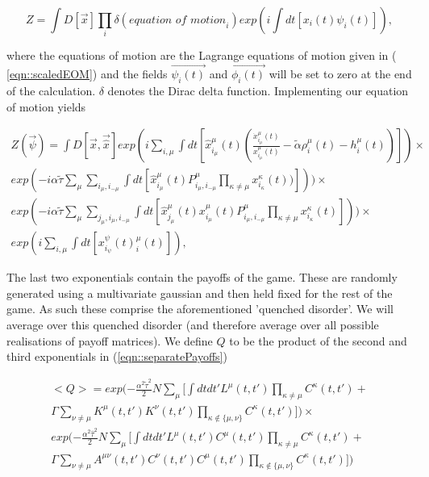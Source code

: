 \documentclass[sigconf]{aamas}
\newcommand{\xmu}[2]{x_{#1_#2}^{#2}(t)}
\newcommand{\payoff}[2]{P^{#2}_{#1_#2, #1_{-#2}}}
\newcommand{\dxmu}[1]{\dot{x}_{#1_\mu}^{\mu} (t)}
\newcommand{\hxmu}[1]{\hat{x}_{#1_\mu}^{\mu} (t)}
\newcommand{\talpha}{\tilde{\alpha}}
\newcommand{\ttau}{\tilde{\tau}}
\newcommand{\htau}{\hat{\tau}}
\begin{document}
\begin{equation}
	Z = \int D[\Vec{x}] \prod_i \delta(\textit{equation of motion}_i) exp(i
	\int dt[x_i(t) \psi_i(t)]), 
\end{equation}

where the equations of motion are the Lagrange equations of motion given in (
\ref{eqn::scaledEOM}) and
the fields $\Vec{\psi_i(t)}$ and $\Vec{\phi_i(t)}$ will be set to zero at the end of the
calculation. $\delta$ denotes the Dirac delta function. Implementing our equation of motion yields

\begin{equation}
\label{eqn::separatePayoffs}
	\begin{split}
	Z(\Vec{\psi}) = \int D[\Vec{x}, \Vec{\hat{x}}] exp( i \sum_{i, \mu} \int dt [ \hxmu{i} (\frac{\dxmu{i}}{\xmu{i}{\mu}} - \talpha \rho_i^\mu (t) - h_i^\mu (t))]) \times \\ exp(-i \alpha \ttau \sum_{\mu} \sum_{i_\mu, i_{-\mu}} \int dt [\hxmu{i} \payoff{i}{\mu} \prod_{\kappa \neq \mu} \xmu{i}{\kappa} )])) 
    \times \\ exp(-i \alpha \ttau \sum_{\mu} \sum_{j_\mu, i_\mu, i_{-\mu}} \int dt [\hxmu{j}  \xmu{i}{\mu} \payoff{i}{\mu} \prod_{\kappa \neq \mu} \xmu{i}{\kappa}])) 
	\times \\ exp(i \sum_{i, \mu}
	\int dt[\xmu{i} \psi^\mu_i(t)]),
\end{split}
\end{equation}

The last two exponentials contain the payoffs of the game. These are randomly generated using a multivariate gaussian and then held fixed for the rest of the game. As such these comprise the aforementioned 'quenched disorder'. We will average over this quenched disorder (and therefore average over all possible realisations of payoff matrices). We define $Q$ to be the product of the second and third exponentials in (\ref{eqn::separatePayoffs}) 

\begin{equation}
\begin{split}
        <Q> = exp(- \frac{\alpha^2 \ttau ^2}{2} N \sum_{\mu} \Big [ \int dt dt' L^\mu(t, t') \prod_{\kappa \neq \mu} C^\kappa (t, t') + \\ \Gamma \sum_{\nu \neq \mu} K^\mu (t, t') K^\nu (t, t') \prod_{\kappa \not\in \{\mu, \nu\}} C^\kappa (t, t') \Big ] ) \times \\
        exp(- \frac{\alpha^2 \htau ^2}{2} N \sum_{\mu} \Big [ \int dt dt' L^\mu(t, t') C^\mu (t, t') \prod_{\kappa \neq \mu} C^\kappa (t, t') + \\ \Gamma \sum_{\nu \neq \mu} A^{\mu \nu} (t, t') C^\nu (t, t') C^\mu (t, t') \prod_{\kappa \not\in \{\mu, \nu\}} C^\kappa (t, t') \Big ] )
\end{split}
\end{equation}
\end{document}
